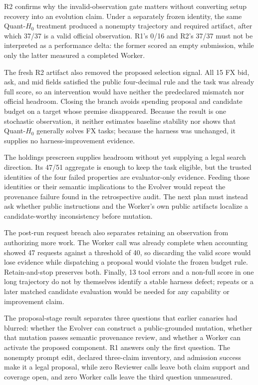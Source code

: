 R2 confirms why the invalid-observation gate matters without converting setup
recovery into an evolution claim. Under a separately frozen identity, the same
Quant-$H_0$ treatment produced a nonempty trajectory and required artifact,
after which 37/37 is a valid official observation. R1's 0/16 and R2's 37/37
must not be interpreted as a performance delta: the former scored an empty
submission, while only the latter measured a completed Worker.

The fresh R2 artifact also removed the proposed selection signal. All 15 FX
bid, ask, and mid fields satisfied the public four-decimal rule and the task was
already full score, so an intervention would have neither the predeclared
mismatch nor official headroom. Closing the branch avoids spending proposal
and candidate budget on a target whose premise disappeared. Because the result
is one stochastic observation, it neither estimates baseline stability nor
shows that Quant-$H_0$ generally solves FX tasks; because the harness was
unchanged, it supplies no harness-improvement evidence.

The holdings prescreen supplies headroom without yet supplying a legal search
direction. Its 47/51 aggregate is enough to keep the task eligible, but the
trusted identities of the four failed properties are evaluator-only evidence.
Feeding those identities or their semantic implications to the Evolver would
repeat the provenance failure found in the retrospective audit. The next plan
must instead ask whether public instructions and the Worker's own public
artifacts localize a candidate-worthy inconsistency before mutation.

The post-run request breach also separates retaining an observation from
authorizing more work. The Worker call was already complete when accounting
showed 47 requests against a threshold of 40, so discarding the valid score
would lose evidence while dispatching a proposal would violate the frozen
budget rule. Retain-and-stop preserves both. Finally, 13 tool errors and a
non-full score in one long trajectory do not by themselves identify a stable
harness defect; repeats or a later matched candidate evaluation would be
needed for any capability or improvement claim.

The proposal-stage result separates three questions that earlier canaries had
blurred: whether the Evolver can construct a public-grounded mutation, whether
that mutation passes semantic provenance review, and whether a Worker can
activate the proposed component. R1 answers only the first question. The
nonempty prompt edit, declared three-claim inventory, and admission success make
it a legal proposal, while zero Reviewer calls leave both claim support and
coverage open, and zero Worker calls leave the third question unmeasured.

